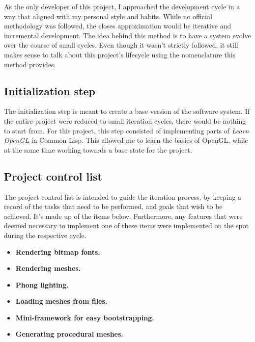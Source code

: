 %

As the only developer of this project,
I approached the development cycle in a way that aligned with my personal style and habits.
While no official methodology was followed,
the closes approximation would be iterative and incremental development.
The idea behind this method is to have a system evolve over the course of small cycles.
Even though it wasn't strictly followed,
it still makes sense to talk about this project's lifecycle using the nomenclature this method provides.

\subsection{Initialization step}

The initialization step is meant to create a base version of the software system.
If the entire project were reduced to small iteration cycles,
there would be nothing to start from.
For this project,
this step consisted of implementing parts of \textit{Learn OpenGL}\cite{learnopengl} in Common Lisp.
This allowed me to learn the basics of OpenGL,
while at the same time working towards a base state for the project.

\subsection{Project control list}

The project control list is intended to guide the iteration process,
by keeping a record of the tasks that need to be performed,
and goals that wish to be achieved.
It's made up of the items below.
Furthermore,
any features that were deemed necessary to implement one of these items were implemented on the spot during the respective cycle.

\begin{itemize}
\item \textbf{Rendering bitmap fonts.}
\item \textbf{Rendering meshes.}
\item \textbf{Phong lighting.}
\item \textbf{Loading meshes from files.}
\item \textbf{Mini-framework for easy bootstrapping.}
\item \textbf{Generating procedural meshes.}
\end{itemize}
